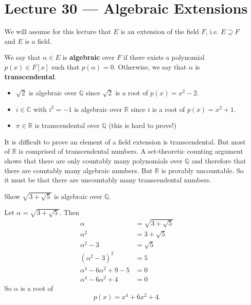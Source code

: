 \section{Lecture 30 — Algebraic Extensions}

We will assume for this lecture that $E$ is an extension of the field $F$, i.e. $E\supseteq F$ and $E$ is a field.

\begin{definition}
	We say that $\alpha\in E$ is \textbf{algebraic} over $F$ if there exists a polynomial $p(x)\in F[x]$ such that $p(\alpha)=0$. Otherwise, we say that $\alpha$ is \textbf{transcendental}.
\end{definition}

\begin{example}\phantom{x}
	\begin{itemize}
		\item $\sqrt 2$ is algebraic over $\mathbb Q$ since $\sqrt 2$ is a root of $p(x)=x^2-2$.
		\item $i\in\mathbb C$ with $i^2=-1$ is algebraic over $\mathbb R$ since $i$ is a root of $p(x)=x^2+1$.
		\item $\pi\in\mathbb R$ is transcendental over $\mathbb Q$ (this is hard to prove!)
	\end{itemize}
\end{example}

\begin{remark}
	It is difficult to prove an element of a field extension is transcendental. But most of $\mathbb R$ is comprised of transcendental numbers. A set-theoretic counting argument shows that there are only countably many polynomials over $\mathbb Q$ and therefore that there are countably many algebraic numbers. But $\mathbb R$ is provably uncountable. So it must be that there are uncountably many transcendental numbers.
\end{remark}

\begin{example}
	Show $\sqrt{3+\sqrt 5}$ is algebraic over $\mathbb Q$.
	\begin{solution}
		Let $\alpha=\sqrt{3+\sqrt 5}$. Then
		\begin{align*}
			\alpha&=\sqrt{3+\sqrt 5}\\
			\alpha^2&=3+\sqrt 5\\
			\alpha^2-3&=\sqrt 5\\
			(\alpha^2-3)^2&=5\\
			\alpha^4-6\alpha^2+9-5&=0\\
			\alpha^4-6\alpha^2+4&=0
		\end{align*}
		So $\alpha$ is a root of
		$$p(x)=x^4+6x^2+4.$$
	\end{solution}
\end{example}


